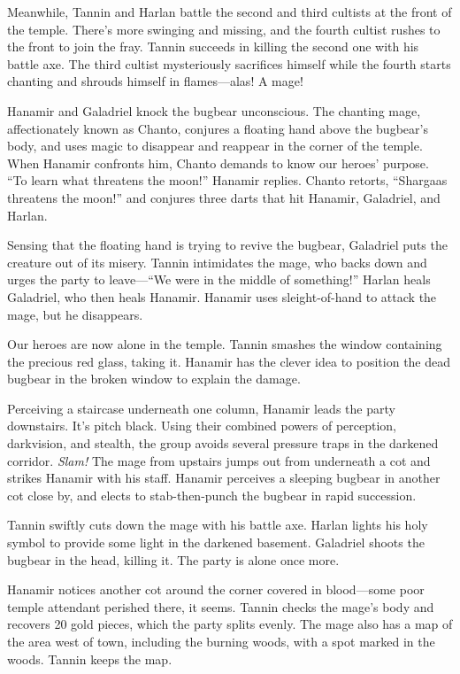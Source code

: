 \documentclass[smalldemyvopaper,11pt,twoside,onecolumn,openright,extrafontsizes]{memoir}
\begin{document}
Meanwhile, Tannin and Harlan battle the second and third cultists at the
front of the temple. There's more swinging and missing, and the fourth
cultist rushes to the front to join the fray. Tannin succeeds in killing
the second one with his battle axe. The third cultist mysteriously
sacrifices himself while the fourth starts chanting and shrouds himself
in flames---alas! A mage!

Hanamir and Galadriel knock the bugbear unconscious. The chanting mage,
affectionately known as Chanto, conjures a floating hand above the
bugbear's body, and uses magic to disappear and reappear in the corner
of the temple. When Hanamir confronts him, Chanto demands to know our
heroes' purpose. ``To learn what threatens the moon!'' Hanamir replies.
Chanto retorts, ``Shargaas threatens the moon!'' and conjures three
darts that hit Hanamir, Galadriel, and Harlan.

Sensing that the floating hand is trying to revive the bugbear,
Galadriel puts the creature out of its misery. Tannin intimidates the
mage, who backs down and urges the party to leave---``We were in the
middle of something!'' Harlan heals Galadriel, who then heals Hanamir.
Hanamir uses sleight-of-hand to attack the mage, but he disappears.

Our heroes are now alone in the temple. Tannin smashes the window
containing the precious red glass, taking it. Hanamir has the clever
idea to position the dead bugbear in the broken window to explain the
damage.

Perceiving a staircase underneath one column, Hanamir leads the party
downstairs. It's pitch black. Using their combined powers of perception,
darkvision, and stealth, the group avoids several pressure traps in the
darkened corridor. \emph{Slam!} The mage from upstairs jumps out from
underneath a cot and strikes Hanamir with his staff. Hanamir perceives a
sleeping bugbear in another cot close by, and elects to stab-then-punch
the bugbear in rapid succession.

Tannin swiftly cuts down the mage with his battle axe. Harlan lights his
holy symbol to provide some light in the darkened basement. Galadriel
shoots the bugbear in the head, killing it. The party is alone once
more.

Hanamir notices another cot around the corner covered in blood---some
poor temple attendant perished there, it seems. Tannin checks the mage's
body and recovers 20 gold pieces, which the party splits evenly. The
mage also has a map of the area west of town, including the burning
woods, with a spot marked in the woods. Tannin keeps the map.
\end{document}
